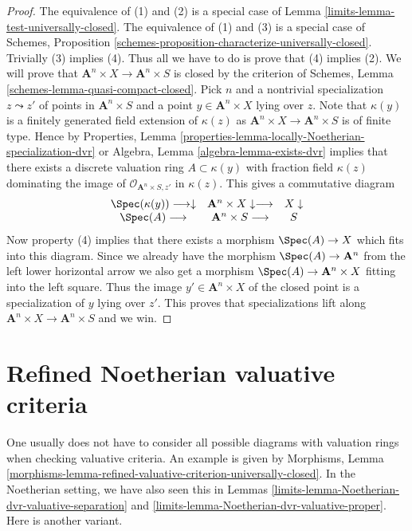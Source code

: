\begin{proof}

The equivalence of (1) and (2) is a special case of
Lemma \ref{limits-lemma-test-universally-closed}.
The equivalence of (1) and (3) is a special case of
Schemes, Proposition \ref{schemes-proposition-characterize-universally-closed}.
Trivially (3) implies (4).
Thus all we have to do is prove that (4) implies (2).
We will prove that $\mathbf{A}^n \times X \to \mathbf{A}^n \times S$
is closed by the criterion of
Schemes, Lemma \ref{schemes-lemma-quasi-compact-closed}.
Pick $n$ and a nontrivial specialization $z \leadsto z'$ of points
in $\mathbf{A}^n \times S$ and a point $y \in \mathbf{A}^n \times X$
lying over $z$. Note that $\kappa(y)$ is a finitely generated field
extension of $\kappa(z)$ as $\mathbf{A}^n \times X \to \mathbf{A}^n \times S$
is of finite type. Hence by
Properties, Lemma \ref{properties-lemma-locally-Noetherian-specialization-dvr}
or
Algebra, Lemma \ref{algebra-lemma-exists-dvr}
implies that there exists a discrete valuation ring $A \subset \kappa(y)$
with fraction field $\kappa(z)$ dominating the image of
$\mathcal{O}_{\mathbf{A}^n \times S, z'}$ in $\kappa(z)$.
This gives a commutative diagram
$$
\begin{array}{ccc}\Spec(\kappa(y)) \longrightarrow\downarrow & \mathbf{A}^n \times X \downarrow\longrightarrow & X \downarrow \\ \Spec(A) \longrightarrow & \mathbf{A}^n \times S \longrightarrow & S\end{array}
$$
Now property (4) implies that there exists a morphism
$\Spec(A) \to X$ which fits into this diagram.
Since we already have the morphism $\Spec(A) \to \mathbf{A}^n$
from the left lower horizontal arrow we also get a morphism
$\Spec(A) \to \mathbf{A}^n \times X$ fitting into the
left square. Thus the image $y' \in \mathbf{A}^n \times X$
of the closed point is a specialization of $y$ lying over $z'$.
This proves that specializations lift along
$\mathbf{A}^n \times X \to \mathbf{A}^n \times S$
and we win.
\end{proof}

\section{Refined Noetherian valuative criteria}
\label{limits-section-refined-valuative-criteria}
One usually does not have to consider all possible diagrams with
valuation rings when checking valuative criteria. An example is
given by Morphisms, Lemma
\ref{morphisms-lemma-refined-valuative-criterion-universally-closed}.
In the Noetherian setting, we have also seen this in
Lemmas \ref{limits-lemma-Noetherian-dvr-valuative-separation} and
\ref{limits-lemma-Noetherian-dvr-valuative-proper}. Here is another variant.

